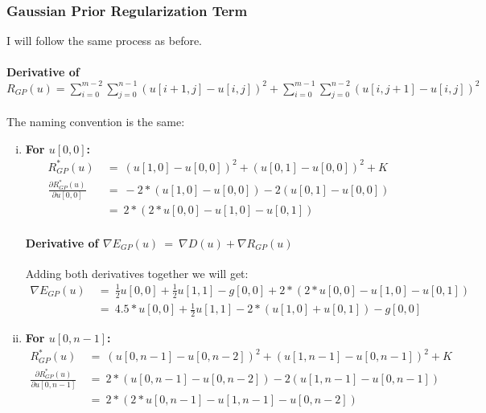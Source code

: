 \documentclass{report}
\begin{document}
			\subsubsection{Gaussian Prior Regularization Term}
			\startsubsection
				I will follow the same process as before.
				\vspace{-0.4cm} \paragraph{Derivative of $R_{GP}(u) = \sum_{i=0}^{m-2} \sum_{j=0}^{n-1} ( u[i+1,j] - u[i,j] )^2 + \sum_{i=0}^{m-1} \sum_{j=0}^{n-2} ( u[i,j+1] - u[i,j] )^2$}
				\startsubsection
					\vspace{0.2cm} The naming convention is the same:
					\begin{enumerate}[(i)]
						\item \textbf{For $u[0,0]$:}
						\begin{align*}
							R_{GP}^*(u) \ & = \ (u[1,0] - u[0,0])^2 + (u[0,1] - u[0,0])^2 + K \\
							\frac{\partial R_{GP}^*(u)}{\partial u[0,0]} \ & = \ -2 * (u[1,0] - u[0,0]) - 2 (u[0,1] - u[0,0]) \\
							& = \ 2 * (2 * u[0,0] - u[1,0] - u[0,1])
						\end{align*}
						\vspace{-0.4cm} \paragraph{Derivative of $\nabla E_{GP}(u) \ = \ \nabla D(u) + \nabla R_{GP}(u)$}
						\startsubsection
							Adding both derivatives together we will get:
							\vspace{-0.3cm}
							\begin{align*}
								\nabla E_{GP}(u) \ & = \ \frac{1}{2} u[0,0]  + \frac{1}{2} u[1,1] - g[0,0] + 2 * (2 * u[0,0] - u[1,0] - u[0,1]) \\
								& = \ 4.5 * u[0,0] + \frac{1}{2} u[1,1] - 2*(u[1,0] + u[0,1]) - g[0,0]
							\end{align*}
						\closesection
						\item \textbf{For $u[0,n-1]$:}
						\begin{align*}
							R_{GP}^*(u) \ & = \ (u[0,n-1] - u[0,n-2])^2 + (u[1,n-1] - u[0,n-1])^2 + K \\
							\frac{\partial R_{GP}^*(u)}{\partial u[0,n-1]} \ & = \ 2 * (u[0,n-1] - u[0,n-2]) - 2 (u[1,n-1] - u[0,n-1]) \\
							& = \ 2 * (2 * u[0,n-1] - u[1,n-1] - u[0,n-2])

\end{align*}
\end{enumerate}
\end{document}
